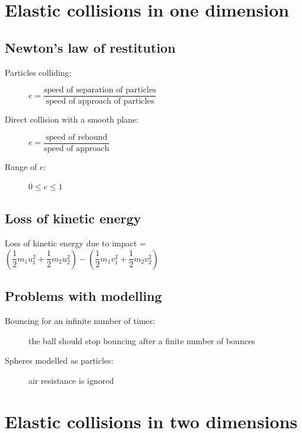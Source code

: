 \documentclass[11pt, A4paper]{article}
\begin{document}
	
	\section[4 Elastic collisions in one dimension]{Elastic collisions in one dimension}
	\subsection{Newton's law of restitution}
	\begin{description}
		\item[Particles colliding:] $e=\dfrac{\text{speed of separation of particles}}{\text{speed of approach of particles}}$
		\item[Direct collision with a smooth plane:] $e=\dfrac{\text{speed of rebound}}{\text{speed of approach}}$
		\item[Range of $e$:] $0 \leq e \leq 1$
	\end{description}
	
	\subsection{Loss of kinetic energy}
	Loss of kinetic energy due to impact = $(\dfrac{1}{2}m_1u_1^2+\dfrac{1}{2}m_2u_2^2)-(\dfrac{1}{2}m_1v_1^2+\dfrac{1}{2}m_2v_2^2)$
	
	\subsection{Problems with modelling} %
	\begin{description}
		\item[Bouncing for an infinite number of times:] the ball should stop bouncing after a finite number of bounces
		\item[Spheres modelled as particles:] air resistance is ignored
	\end{description}
	
	\section[5 Elastic collisions in two dimensions]{Elastic collisions in two dimensions}
\end{document}
